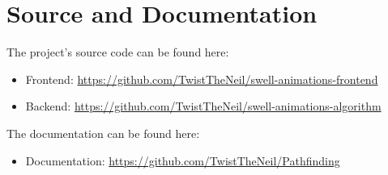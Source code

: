 \section{Source and Documentation} \label{App:AppendixSD}
The project's source code can be found here:
\begin{itemize}
    \item Frontend: \url{https://github.com/TwistTheNeil/swell-animations-frontend}
    \item Backend: \url{https://github.com/TwistTheNeil/swell-animations-algorithm}
\end{itemize}
The documentation can be found here:
\begin{itemize}
    \item Documentation: \url{https://github.com/TwistTheNeil/Pathfinding}
\end{itemize}
